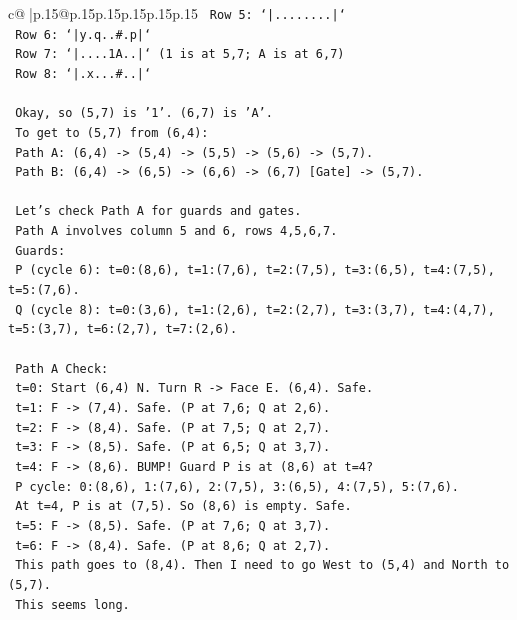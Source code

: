 \documentclass{article}
\begin{document}
{\begin{supertabular}{c@{$\;$}|p{.15\linewidth}@{}p{.15\linewidth}p{.15\linewidth}p{.15\linewidth}p{.15\linewidth}p{.15\linewidth}}
{{{\texttt{  Row 5: `|........|`} \\
\texttt{  Row 6: `|y.q..\#.p|`} \\
\texttt{  Row 7: `|....1A..|` (1 is at 5,7; A is at 6,7)} \\
\texttt{  Row 8: `|.x...\#..|`} \\
\\ 
\texttt{  Okay, so (5,7) is '1'. (6,7) is 'A'.} \\
\texttt{  To get to (5,7) from (6,4):} \\
\texttt{  Path A: (6,4) {-}> (5,4) {-}> (5,5) {-}> (5,6) {-}> (5,7).} \\
\texttt{  Path B: (6,4) {-}> (6,5) {-}> (6,6) {-}> (6,7) {[}Gate{]} {-}> (5,7).} \\
\\ 
\texttt{  Let's check Path A for guards and gates.} \\
\texttt{  Path A involves column 5 and 6, rows 4,5,6,7.} \\
\texttt{  Guards:} \\
\texttt{  P (cycle 6): t=0:(8,6), t=1:(7,6), t=2:(7,5), t=3:(6,5), t=4:(7,5), t=5:(7,6).} \\
\texttt{  Q (cycle 8): t=0:(3,6), t=1:(2,6), t=2:(2,7), t=3:(3,7), t=4:(4,7), t=5:(3,7), t=6:(2,7), t=7:(2,6).} \\
\\ 
\texttt{  Path A Check:} \\
\texttt{  t=0: Start (6,4) N. Turn R {-}> Face E. (6,4). Safe.} \\
\texttt{  t=1: F {-}> (7,4). Safe. (P at 7,6; Q at 2,6).} \\
\texttt{  t=2: F {-}> (8,4). Safe. (P at 7,5; Q at 2,7).} \\
\texttt{  t=3: F {-}> (8,5). Safe. (P at 6,5; Q at 3,7).} \\
\texttt{  t=4: F {-}> (8,6). BUMP! Guard P is at (8,6) at t=4?} \\
\texttt{     P cycle: 0:(8,6), 1:(7,6), 2:(7,5), 3:(6,5), 4:(7,5), 5:(7,6).} \\
\texttt{     At t=4, P is at (7,5). So (8,6) is empty. Safe.} \\
\texttt{  t=5: F {-}> (8,5). Safe. (P at 7,6; Q at 3,7).} \\
\texttt{  t=6: F {-}> (8,4). Safe. (P at 8,6; Q at 2,7).} \\
\texttt{  This path goes to (8,4). Then I need to go West to (5,4) and North to (5,7).} \\
\texttt{  This seems long.} \\
}}}
\end{supertabular}}
\end{document}
